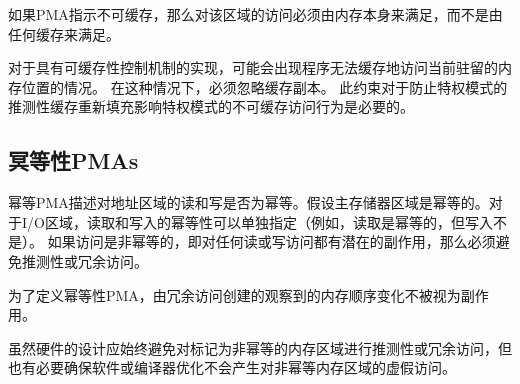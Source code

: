 {\iffalse
If a PMA indicates non-cacheability, then accesses to that region must
be satisfied by the memory itself, not by any caches.
\fi
如果PMA指示不可缓存，那么对该区域的访问必须由内存本身来满足，而不是由任何缓存来满足。

\iffalse
\begin{commentary}
For implementations with a cacheability-control mechanism, the situation
may arise that a program uncacheably accesses a memory location that is
currently cache-resident.
In this situation, the cached copy must be ignored.
This constraint is necessary to prevent more-privileged modes' speculative
cache refills from affecting the behavior of less-privileged modes'
uncacheable accesses.
\end{commentary}
\fi
\begin{commentary}
对于具有可缓存性控制机制的实现，可能会出现程序无法缓存地访问当前驻留的内存位置的情况。
在这种情况下，必须忽略缓存副本。
此约束对于防止特权模式的推测性缓存重新填充影响特权模式的不可缓存访问行为是必要的。
\end{commentary}

\subsection{冥等性PMAs}

\iffalse
Idempotency PMAs describe whether reads and writes to an address
region are idempotent.  Main memory regions are assumed to be
idempotent.  For I/O regions, idempotency on reads and writes can be
specified separately (e.g., reads are idempotent but writes are not).
If accesses are non-idempotent, i.e., there is potentially a side
effect on any read or write access, then speculative or redundant
accesses must be avoided.
\fi
幂等PMA描述对地址区域的读和写是否为幂等。假设主存储器区域是幂等的。对于I/O区域，读取和写入的幂等性可以单独指定（例如，读取是幂等的，但写入不是）。
如果访问是非幂等的，即对任何读或写访问都有潜在的副作用，那么必须避免推测性或冗余访问。

\iffalse
For the purposes of defining the idempotency PMAs, changes in observed
memory ordering created by redundant accesses are not considered a
side effect.
\fi
为了定义幂等性PMA，由冗余访问创建的观察到的内存顺序变化不被视为副作用。

\iffalse
\begin{commentary}
While hardware should always be designed to avoid speculative or
redundant accesses to memory regions marked as non-idempotent, it is
also necessary to ensure software or compiler optimizations do not
generate spurious accesses to non-idempotent memory regions.
\end{commentary}
\fi
\begin{commentary}
虽然硬件的设计应始终避免对标记为非幂等的内存区域进行推测性或冗余访问，但也有必要确保软件或编译器优化不会产生对非幂等内存区域的虚假访问。
\end{commentary}

}
